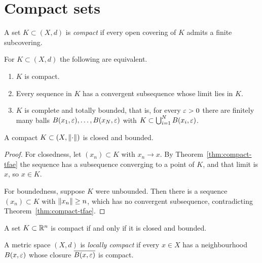 \section{Compact sets}

\begin{definition}[Compactness]\label{def:compact}
A set $K \subset (X,d)$ is \emph{compact} if every open covering of $K$
admits a finite subcovering.
\end{definition}

\begin{theorem}\label{thm:compact-tfae}
For $K \subset (X,d)$ the following are equivalent.
\begin{enumerate}
  \item $K$ is compact.
  \item Every sequence in $K$ has a convergent subsequence whose limit lies
    in $K$.
  \item $K$ is complete and totally bounded, that is, for every $\varepsilon > 0$
    there are finitely many balls $B(x_1, \varepsilon), \dots, B(x_N, \varepsilon)$ with
    $K \subset \bigcup_{i=1}^{N} B(x_i, \varepsilon)$.
\end{enumerate}
\end{theorem}

\begin{lemma}\label{lem:compact-closed-bounded}
A compact $K \subset (X, \lVert\cdot\rVert)$ is closed and bounded.
\end{lemma}

\begin{proof}
For closedness, let $(x_n) \subset K$ with $x_n \to x$. By
Theorem~\ref{thm:compact-tfae} the sequence has a subsequence converging to a
point of $K$, and that limit is $x$, so $x \in K$.

For boundedness, suppose $K$ were unbounded. Then there is a sequence
$(x_n) \subset K$ with $\lVert x_n\rVert \ge n$, which has no convergent
subsequence, contradicting Theorem~\ref{thm:compact-tfae}.
\end{proof}

\begin{theorem}\label{thm:heine-borel}
A set $K \subset \mathbb{R}^n$ is compact if and only if it is closed and bounded.
\end{theorem}

\begin{definition}\label{def:locally-compact}
A metric space $(X,d)$ is \emph{locally compact} if every $x \in X$ has a
neighbourhood $B(x, \varepsilon)$ whose closure $\overline{B(x,\varepsilon)}$ is compact.
\end{definition}


